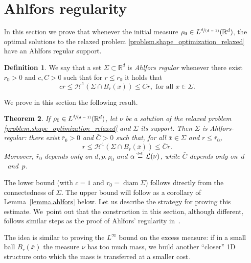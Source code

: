 \documentclass[10pt]{amsart}
\newcommand{\spfrac}[2]{\sfrac{#1}{(#2)}}
\newtheorem{theorem}{Theorem}[section]
\theoremstyle{definition}
\newtheorem{definition}[theorem]{Definition}
\newcommand{\eqdef}{\ensuremath{\stackrel{\mbox{\upshape\tiny def.}}{=}}}
\newcommand\cH{\mathcal{H}}
\newcommand{\RR}{\mathbb{R}}
\DeclareMathOperator{\diam}{diam}
\begin{document}
\section{Ahlfors regularity}\label{section.ahlfors_regularity}
In this section we prove that whenever the initial measure $\rho_0 \in L^{\spfrac{d}{d-1}}(\RR^d)$, the optimal solutions to the relaxed problem \eqref{problem.shape_optimization_relaxed} have an Ahlfors regular support.

\begin{definition}\label{definition.alhfords_regularity}
We say that a set $\Sigma \subset \RR^d$ is \emph{Ahlfors regular} whenever there exist $r_0>0$ and $c,C>0$ such that for $r \le r_0$ it holds that
\[
cr \le \cH^1(\Sigma \cap B_r(x)) \le Cr, \text{ for all $x \in \Sigma$.}
\]
\end{definition}

We prove in this section the following result.
\begin{theorem}\label{th:ahlfors}
If $\rho_0\in L^{\spfrac{d}{d-1}}(\RR^d)$, let $\nu$ be a solution of the relaxed problem \eqref{problem.shape_optimization_relaxed} and $\Sigma$ its support. Then $\Sigma$ is Ahlfors-regular: there exist $\bar r_0>0$ and $\bar C>0$ such that, for all $\bar x \in \Sigma$ and $r \le \bar r_0$,
\[
r \le \cH^1(\Sigma \cap B_r(\bar x)) \le \bar C r.
\]
Moreover, $\bar r_0$ depends only on $d,p,\rho_0$ and $\alpha \eqdef \mathcal{L}(\nu)$, while $\bar C$ depends only on~$d$~and~$p$.
\end{theorem}
The lower bound (with $c=1$ and $r_0=\diam\Sigma$) follows directly from the connectedness of $\Sigma$. The upper bound will follow as a corollary of
Lemma~\ref{lemma.ahlfors} below. Let us describe the strategy for proving this estimate. We~point out that the construction in this section,
although different, follows similar steps as
the proof of Ahlfors' regularity in~\cite[Lem.\,6.1, Th.\,6.4]{paolini2004qualitative}.

The idea is similar to
proving the $L^\infty$ bound on the excess measure: if in a small ball
$B_r(\bar x)$ the measure $\nu$ has too much mass,
we build another ``closer'' 1D structure onto which the mass is transferred at a smaller cost.
\end{document}
